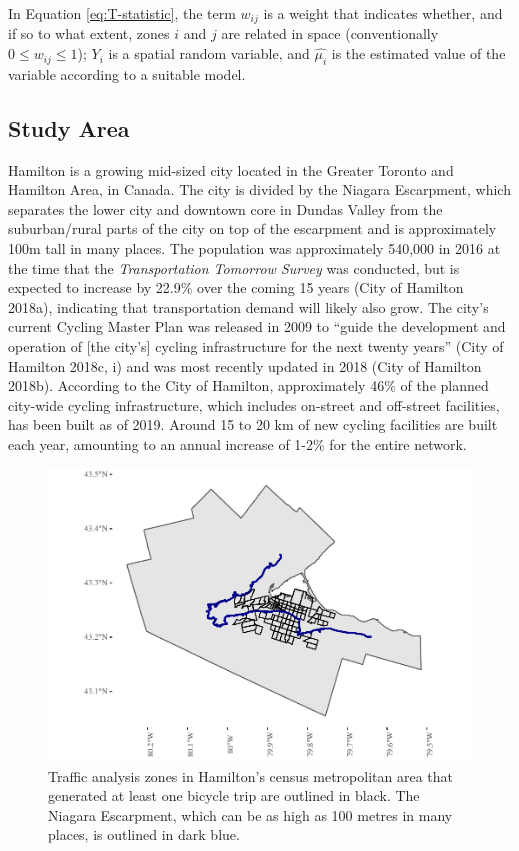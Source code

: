 \documentclass[smallextended]{svjour3}       %
\begin{document}
In Equation \ref{eq:T-statistic}, the term \(w_{ij}\) is a weight that
indicates whether, and if so to what extent, zones \(i\) and \(j\) are
related in space (conventionally \(0\le w_{ij}\le 1\)); \(Y_i\) is a
spatial random variable, and \(\hat{\mu_i}\) is the estimated value of
the variable according to a suitable model.

\hypertarget{study-area}{%
\subsection{Study Area}\label{study-area}}

Hamilton is a growing mid-sized city located in the Greater Toronto and
Hamilton Area, in Canada. The city is divided by the Niagara Escarpment,
which separates the lower city and downtown core in Dundas Valley from
the suburban/rural parts of the city on top of the escarpment and is
approximately 100m tall in many places. The population was approximately
540,000 in 2016 at the time that the \emph{Transportation Tomorrow
Survey} was conducted, but is expected to increase by 22.9\% over the
coming 15 years (City of Hamilton 2018a), indicating that transportation
demand will likely also grow. The city's current Cycling Master Plan was
released in 2009 to ``guide the development and operation of {[}the
city's{]} cycling infrastructure for the next twenty years'' (City of
Hamilton 2018c, i) and was most recently updated in 2018 (City of
Hamilton 2018b). According to the City of Hamilton, approximately 46\%
of the planned city-wide cycling infrastructure, which includes
on-street and off-street facilities, has been built as of 2019. Around
15 to 20 km of new cycling facilities are built each year, amounting to
an annual increase of 1-2\% for the entire network.

\begin{figure}
\centering
\includegraphics{Correlates-cycling-flows-routes_files/figure-latex/context-plot-1.pdf}
\caption{\label{fig:context-plot} Traffic analysis zones in Hamilton's
census metropolitan area that generated at least one bicycle trip are
outlined in black. The Niagara Escarpment, which can be as high as 100
metres in many places, is outlined in dark blue.}
\end{figure}
\end{document}
